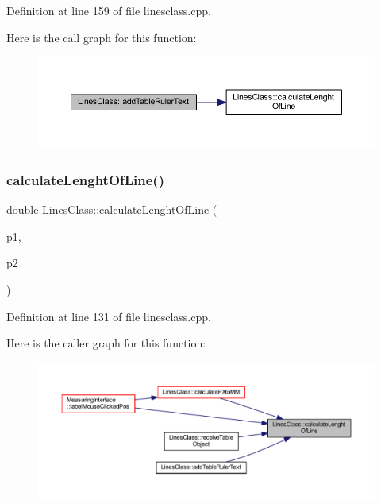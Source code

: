 Definition at line 159 of file linesclass.\+cpp.

Here is the call graph for this function\+:
\nopagebreak
\begin{figure}[H]
\begin{center}
\leavevmode
\includegraphics[width=350pt]{classLinesClass_a40228921775f778a33a391bad2830d1c_cgraph}
\end{center}
\end{figure}
\mbox{\label{classLinesClass_ad8ab0bbd2b5482724948b04eba86d2f2}} 
\subsubsection{\texorpdfstring{calculateLenghtOfLine()}{calculateLenghtOfLine()}}
{\footnotesize\ttfamily double Lines\+Class\+::calculate\+Lenght\+Of\+Line (\begin{DoxyParamCaption}\item[{const Q\+Point}]{p1,  }\item[{const Q\+Point}]{p2 }\end{DoxyParamCaption})\hspace{0.3cm}{\ttfamily [static]}}



Definition at line 131 of file linesclass.\+cpp.

Here is the caller graph for this function\+:
\nopagebreak
\begin{figure}[H]
\begin{center}
\leavevmode
\includegraphics[width=350pt]{classLinesClass_ad8ab0bbd2b5482724948b04eba86d2f2_icgraph}
\end{center}
\end{figure}
\mbox{\label{classLinesClass_a7b00d7bf8c4c9b96d643c2299c52ea62}} 
